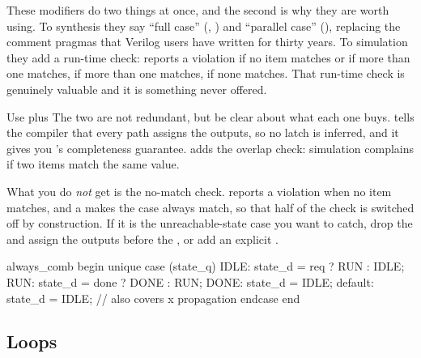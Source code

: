 
These modifiers do two things at once, and the second is why they are worth
using. To synthesis they say ``full case'' (, ) and
``parallel case'' (), replacing the comment pragmas that Verilog
users have written for thirty years. To simulation they add a run-time check:
 reports a violation if no item matches or if more than one
matches,  if more than one matches,  if none
matches. That run-time check is genuinely valuable and it is something \VHDL{}
never offered.

\begin{tipbox}{Use  plus }
The two are not redundant, but be clear about what each one buys.
 tells the compiler that every path assigns the outputs, so no
latch is inferred, and it gives you \VHDL{}'s  completeness
guarantee.  adds the overlap check: simulation complains if two
items match the same value.

What you do \emph{not} get is the no-match check.  reports a
violation when no item matches, and a  makes the case always
match, so that half of the check is switched off by construction. If it is the
unreachable-state case you want to catch, drop the  and assign
the outputs before the , or add an explicit
.
\begin{svcode}
always_comb begin
  unique case (state_q)
    IDLE: state_d = req ? RUN : IDLE;
    RUN:  state_d = done ? DONE : RUN;
    DONE: state_d = IDLE;
    default: state_d = IDLE;    // also covers x propagation
  endcase
end
\end{svcode}
\end{tipbox}

\subsection{Loops}

